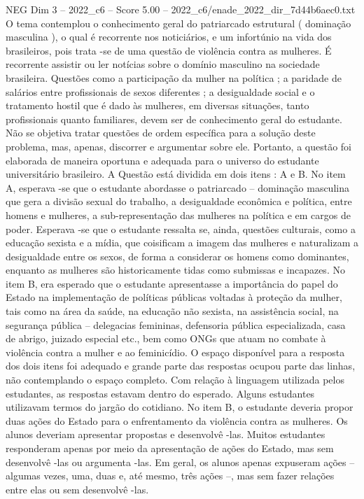 \begin{textsample}{NEG Dim 3 – 2022\_c6 – Score 5.00 – 2022\_c6/enade\_2022\_dir\_7d44b6aec0.txt}
O tema contemplou o conhecimento geral do patriarcado estrutural ( dominação masculina ), o qual é recorrente nos noticiários, e um infortúnio na vida dos brasileiros, pois trata -se de uma questão de violência contra as mulheres.
É recorrente assistir ou ler notícias sobre o domínio masculino na sociedade brasileira.
Questões como a participação da mulher na política ; a paridade de salários entre profissionais de sexos diferentes ; a desigualdade social e o tratamento hostil que é dado às mulheres, em diversas situações, tanto profissionais quanto familiares, devem ser de conhecimento geral do estudante.
Não se objetiva tratar questões de ordem específica para a solução deste problema, mas, apenas, discorrer e argumentar sobre ele.
Portanto, a questão foi elaborada de maneira oportuna e adequada para o universo do estudante universitário brasileiro.
A Questão está dividida em dois itens : A e B.
No item A, esperava -se que o estudante abordasse o patriarcado – dominação masculina que gera a divisão sexual do trabalho, a desigualdade econômica e política, entre homens e mulheres, a sub-representação das mulheres na política e em cargos de poder.
Esperava -se que o estudante ressalta se, ainda, questões culturais, como a educação sexista e a mídia, que coisificam a imagem das mulheres e naturalizam a desigualdade entre os sexos, de forma a considerar os homens como dominantes, enquanto as mulheres são historicamente tidas como submissas e incapazes.
No item B, era esperado que o estudante apresentasse a importância do papel do Estado na implementação de políticas públicas voltadas à proteção da mulher, tais como na área da saúde, na educação não sexista, na assistência social, na segurança pública – delegacias femininas, defensoria pública especializada, casa de abrigo, juizado especial etc., bem como ONGs que atuam no combate à violência contra a mulher e ao feminicídio.
O espaço disponível para a resposta dos dois itens foi adequado e grande parte das respostas ocupou parte das linhas, não contemplando o espaço completo.
Com relação à linguagem utilizada pelos estudantes, as respostas estavam dentro do esperado.
Alguns estudantes utilizavam termos do jargão do cotidiano.
No item B, o estudante deveria propor duas ações do Estado para o enfrentamento da violência contra as mulheres.
Os alunos deveriam apresentar propostas e desenvolvê -las.
Muitos estudantes responderam apenas por meio da apresentação de ações do Estado, mas sem desenvolvê -las ou argumenta -las.
Em geral, os alunos apenas expuseram ações – algumas vezes, uma, duas e, até mesmo, três ações –, mas sem fazer relações entre elas ou sem desenvolvê -las.

\end{textsample}
